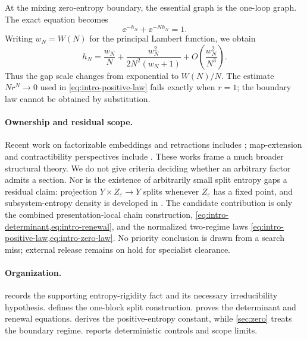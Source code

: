 At the mixing zero-entropy boundary, the essential graph is the one-loop
graph.  The exact equation becomes
\begin{equation}
 \ee^{-h_N}+\ee^{-Nh_N}=1.
 \label{eq:intro-zero-equation}
\end{equation}
Writing $w_N=W(N)$ for the principal Lambert function, we obtain
\begin{equation}
 h_N=\frac{w_N}{N}
 +\frac{w_N^2}{2N^2(w_N+1)}
 +O\left(\frac{w_N^2}{N^3}\right).
 \label{eq:intro-zero-law}
\end{equation}
Thus the gap scale changes from exponential to $W(N)/N$.  The estimate
$Nr^N\to0$ used in \cref{eq:intro-positive-law} fails exactly when $r=1$;
the boundary law cannot be obtained by substitution.



\paragraph{Ownership and residual scope.}
Recent work on factorizable embeddings and retractions includes
\cite{MarcusEtAl2025}; map-extension and contractibility perspectives include
\cite{Meyerovitch2025,PoirierSalo2024}.  These works frame a much broader
structural theory.  We do not give criteria deciding whether an arbitrary
factor admits a section.  Nor is the existence of arbitrarily small split
entropy gaps a residual claim: projection
$Y\times Z_\varepsilon\to Y$ splits whenever $Z_\varepsilon$ has a fixed
point, and subsystem-entropy density is developed in
\cite{BlandMcGoffPavlov2023}.  The candidate contribution is only the
combined presentation-local chain construction,
\cref{eq:intro-determinant,eq:intro-renewal}, and the normalized two-regime
laws \cref{eq:intro-positive-law,eq:intro-zero-law}.  No priority conclusion
is drawn from a search miss; external release remains on hold for specialist
clearance.

\paragraph{Organization.}
 records the supporting entropy-rigidity fact and its
necessary irreducibility hypothesis.   defines the
one-block split construction.   proves the determinant and
renewal equations.   derives the positive-entropy
constant, while \cref{sec:zero} treats the boundary regime.
 reports deterministic controls and scope limits.
